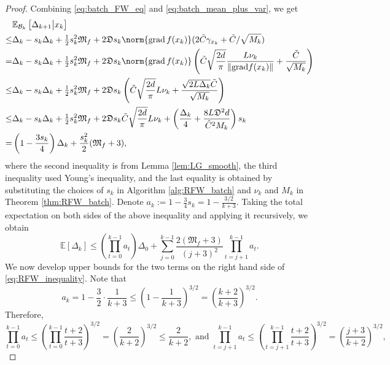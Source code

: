 \documentclass{article}
\newcommand{\rgrad}{\mathrm{grad}}
\newcommand{\pert}{\nu}
\theoremstyle{plain}
\theoremstyle{definition}
\theoremstyle{remark}
\begin{document}
\begin{proof}
Combining \eqref{eq:batch_FW_eq} and \eqref{eq:batch_mean_plus_var}, we get
\begin{align*}
&\mathbb{E}_{\mathcal{B}_k}\left[\Delta_{k+1}\bigl|x_k\right]\\
 \leq & \Delta_{k} 
   - s_k \Delta_k + \tfrac{1}{2}s_k^2 \mathfrak{M}_f +2\mathfrak{D}s_k \norm{\operatorname{grad}f(x_k)} (2\tilde{C} {\gamma_{x_k}}+\tilde{C}/\sqrt{M_k})\\
 = & \Delta_{k} 
   - s_k \Delta_k+ \tfrac{1}{2}s_k^2 \mathfrak{M}_f +2\mathfrak{D}s_k \norm{\operatorname{grad}f(x_k)} \left(\tilde{C}\sqrt{\frac{2d}{\pi}}\frac{{L}\pert_k}{\|\rgrad f(x_k)\|}+\frac{\tilde{C}}{\sqrt{M_k}}\right)\\
 \leq & \Delta_{k} 
   - s_k \Delta_k+ \tfrac{1}{2}s_k^2 \mathfrak{M}_f +2\mathfrak{D}s_k\left(\tilde{C}\sqrt{\frac{2d}{\pi}}{L}\pert_k+ \frac{\sqrt{2{L}\Delta_k}\tilde{C}}{\sqrt{M_k}}\right)\\
 \leq & \Delta_{k} 
   - s_k \Delta_k+ \tfrac{1}{2}s_k^2 \mathfrak{M}_f +2\mathfrak{D}s_k\tilde{C}\sqrt{\frac{2d}{\pi}}{L}\pert_k+ \left(\frac{\Delta_k}{4} + \frac{8{L}\mathfrak{D}^2 d}{\hat{C}^2M_k}\right) s_k \\
   = &\left(1-\frac{3s_k}{4}\right)\Delta_k+ \frac{s_k^2}{2} (\mathfrak{M}_f+3),
\end{align*}
where the second inequality is from Lemma \ref{lem:LG_smooth}, the third inequality used Young's inequality, and the last equality is obtained by substituting the choices of $s_k$ in Algorithm \ref{alg:RFW_batch} and $\nu_k$ and $M_k$ in Theorem \ref{thm:RFW_batch}. 
Denote $a_k := 1-\frac{3}{4}s_k = 1-\frac{3/2}{k+3}$. Taking the total expectation on both sides of the above inequality and applying it recursively, we obtain %
\begin{equation}\label{eq:RFW_inequality}
\mathbb{E}\left[\Delta_{k}\right] \leq 
{\left(\prod_{t=0}^{k-1}a_t\right) \Delta_0}
+ {\sum_{j=0}^{k-1} \frac{2(\mathfrak{M}_f+3)}{(j+3)^2}\prod_{t=j+1}^{k-1} a_t}.
\end{equation}
We now develop upper bounds for the two terms on the right hand side of \eqref{eq:RFW_inequality}. 
Note that 
\[
a_k = 1-\frac{3}{2}\cdot\frac{1}{k+3}\leq\left(1-\frac{1}{k+3}\right)^{3/2}=\left(\frac{k+2}{k+3}\right)^{3/2}.
\]
Therefore, 
\begin{equation*}
\prod_{t=0}^{k-1}a_t\leq\left(\prod_{t=0}^{k-1}\frac{t+2}{t+3}\right)^{3/2}=\left(\frac{2}{k+2}\right)^{3/2}\leq \frac{2}{k+2}, \mbox{ and } \prod_{t=j+1}^{k-1} a_t \leq  \left( \prod_{t=j+1}^{k-1}\frac{t+2}{t+3} \right)^{3/2}=  \left( \frac{j+3}{k+2}\right)^{3/2},

\end{equation*}
\end{proof}
\end{document}
